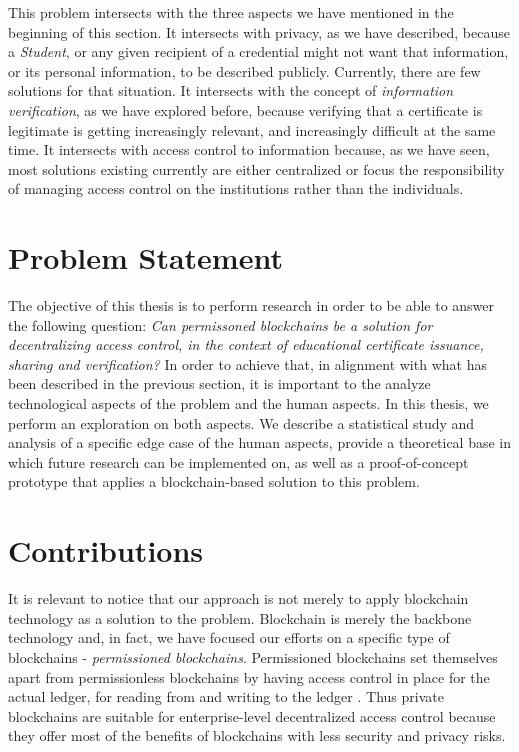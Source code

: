 This problem intersects with the three aspects we have mentioned in the beginning of this section. It intersects with privacy, as we have described, because a \textit{Student}, or any given recipient of a credential might not want that information, or its personal information, to be described publicly. Currently, there are few solutions for that situation. It intersects with the concept of \textit{information verification}, as we have explored before, because verifying that a certificate is legitimate is getting increasingly relevant, and increasingly difficult at the same time. It intersects with access control to information because, as we have seen, most solutions existing currently are either centralized or focus the responsibility of managing access control on the institutions rather than the individuals.

\section{Problem Statement}

The objective of this thesis is to perform research in order to be able to answer the following question: \textit{Can permissoned blockchains be a solution for decentralizing access control, in the context of educational certificate issuance, sharing and verification?} In order to achieve that, in alignment with what has been described in the previous section, it is important to the analyze technological aspects of the problem and the human aspects. In this thesis, we perform an exploration on both aspects. We describe a statistical study and analysis of a specific edge case of the human aspects, provide a theoretical base in which future research can be implemented on, as well as a proof-of-concept prototype that applies a blockchain-based solution to this problem.

\section{Contributions}
\label{sec:contributions}

It is relevant to notice that our approach is not merely to apply blockchain technology as a solution to the problem. Blockchain is merely the backbone technology and, in fact, we have focused our efforts on a specific type of blockchains - \textit{permissioned blockchains}. Permissioned blockchains set themselves apart from permissionless blockchains by having access control in place for the actual ledger, for reading from and writing to the ledger \cite{pilkington_blockchain_2016}. Thus private blockchains are suitable for enterprise-level decentralized access control because they offer most of the benefits of blockchains with less security and privacy risks.

